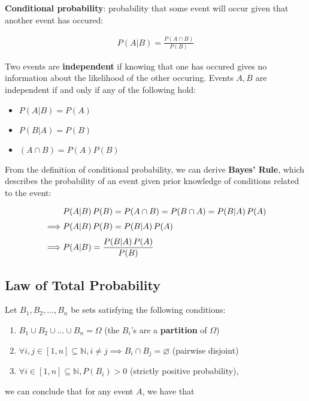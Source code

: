\documentclass[a4paper,10pt]{article}
\newcommand{\N}{\mathbb{N}}
\begin{document}
\textbf{Conditional probability}: probability that some event will occur given that another event has occured:

\begin{align*}
    P(A|B) = \frac{P(A\cap B)}{P(B)}
\end{align*}

Two events are \textbf{independent} if knowing that one has occured gives no information about the likelihood of the other occuring. Events $A, B$ are independent if and only if any of the following hold: 

\begin{itemize}
    \item $P(A|B) = P(A)$
    \item $P(B|A) = P(B)$
    \item $(A\cap B) = P(A)P(B)$
\end{itemize}

From the definition of conditional probability, we can derive \textbf{Bayes' Rule}, which describes the probability of an event given prior knowledge of conditions related to the event: 

\begin{align*}
    &P(A|B)\,P(B) = P(A\cap B) = P(B\cap A) = P(B|A)\,P(A) \\
    \addlinespace[0.1cm]
    \implies &P(A|B)\,P(B) = P(B|A)\,P(A) \\
    \addlinespace[0.1cm]
    \implies &P(A|B) = \frac{P(B|A)\,P(A)}{P(B)} 
\end{align*}

\subsection{Law of Total Probability}

Let $B_1, B_2, \ldots, B_n$ be sets satisfying the following conditions:

\begin{enumerate}
    \item $B_1\cup B_2\cup \ldots \cup B_n = \Omega$ (the $B_i$'s are a \textbf{partition} of $\Omega$)
    \item $\forall i, j \in [1, n]\subseteq \N, i\neq j \implies B_i\cap B_j = \varnothing$ (pairwise disjoint)
    \item $\forall i \in [1, n]\subseteq \N, P(B_i) > 0$ (strictly positive probability),
\end{enumerate}

we can conclude that for any event $A$, we have that 
\end{document}
